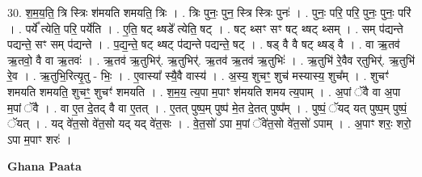 \documentclass[17pt]{extarticle}
\begin{document}
30. श॒म॒य॒ति॒ त्रि स्त्रिः श॑मयति शमयति॒ त्रिः । . त्रिः पुनः॒ पुन॒ स्त्रि स्त्रिः पुनः॑ । . पुनः॒ परि॒ परि॒ पुनः॒ पुनः॒ परि॑ । . पर्ये᳚ त्येति॒ परि॒ पर्ये॑ति । . ए॒ति॒ षट् थ्षडे᳚ त्येति॒ षट् । . षट् थ्सꣳ सꣳ षट् थ्षट् थ्सम् । . सम् प॑द्यन्ते पद्यन्ते॒ सꣳ सम् प॑द्यन्ते । . प॒द्य॒न्ते॒ षट् थ्षट् प॑द्यन्ते पद्यन्ते॒ षट् । . षड् वै वै षट् थ्षड् वै । . वा ऋ॒तव॑ ऋ॒तवो॒ वै वा ऋ॒तवः॑ । . ऋ॒तव॑ ऋ॒तुभिर्॑. ऋ॒तुभिर्॑. ऋ॒तव॑ ऋ॒तव॑ ऋ॒तुभिः॑ । . ऋ॒तुभि॑ रे॒वैव र्‌तुभिर्॑. ऋ॒तुभि॑ रे॒व । . ऋ॒तुभि॒रित्यृ॒तु - भिः॒ । . ए॒वास्या᳚ स्यै॒वै वास्य॑ । . अ॒स्य॒ शुचꣳ॒॒ शुच॑ मस्यास्य॒ शुच᳚म् । . शुचꣳ॑ शमयति शमयति॒ शुचꣳ॒॒ शुचꣳ॑ शमयति । . श॒म॒य॒ त्य॒पा म॒पाꣳ श॑मयति शमय त्य॒पाम् । . अ॒पां ॅवै वा अ॒पा म॒पां ॅवै । . वा ए॒त दे॒तद् वै वा ए॒तत् । . ए॒तत् पुष्प॒म् पुष्प॑ मे॒त दे॒तत् पुष्प᳚म् । . पुष्पं॒ ॅयद् यत् पुष्प॒म् पुष्पं॒ ॅयत् । . यद् वे॑त॒सो वे॑त॒सो यद् यद् वे॑त॒सः । . वे॒त॒सो॑ ऽपा म॒पां ॅवे॑त॒सो वे॑त॒सो॑ ऽपाम् । . अ॒पाꣳ शरः॒ शरो॒ ऽपा म॒पाꣳ शरः॑ । \newline

\textbf{Ghana Paata } \newline
\end{document}
